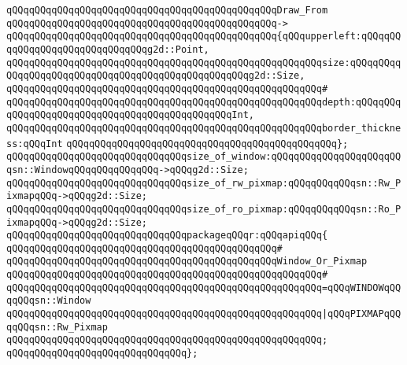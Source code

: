 \verb|qQQqqQQqqQQqqQQqqQQqqQQqqQQqqQQqqQQqqQQqqQQqqQQqDraw_From|\newline
\verb|qQQqqQQqqQQqqQQqqQQqqQQqqQQqqQQqqQQqqQQqqQQqqQQq->|\newline
\verb|qQQqqQQqqQQqqQQqqQQqqQQqqQQqqQQqqQQqqQQqqQQqqQQq{qQQqupperleft:qQQqqQQqqQQqqQQqqQQqqQQqqQQqqQQqg2d::Point,|\newline
\verb|qQQqqQQqqQQqqQQqqQQqqQQqqQQqqQQqqQQqqQQqqQQqqQQqqQQqqQQqsize:qQQqqQQqqQQqqQQqqQQqqQQqqQQqqQQqqQQqqQQqqQQqqQQqqQQqg2d::Size,|\newline
\verb|qQQqqQQqqQQqqQQqqQQqqQQqqQQqqQQqqQQqqQQqqQQqqQQqqQQqqQQq#|\newline
\verb|qQQqqQQqqQQqqQQqqQQqqQQqqQQqqQQqqQQqqQQqqQQqqQQqqQQqqQQqdepth:qQQqqQQqqQQqqQQqqQQqqQQqqQQqqQQqqQQqqQQqqQQqqQQqInt,|\newline
\verb|qQQqqQQqqQQqqQQqqQQqqQQqqQQqqQQqqQQqqQQqqQQqqQQqqQQqqQQqborder_thickness:qQQqInt|\newline
\verb|qQQqqQQqqQQqqQQqqQQqqQQqqQQqqQQqqQQqqQQqqQQqqQQq};|\newline
\newline
\verb|qQQqqQQqqQQqqQQqqQQqqQQqqQQqqQQqsize_of_window:qQQqqQQqqQQqqQQqqQQqqQQqsn::WindowqQQqqQQqqQQqqQQq->qQQqg2d::Size;|\newline
\verb|qQQqqQQqqQQqqQQqqQQqqQQqqQQqqQQqsize_of_rw_pixmap:qQQqqQQqqQQqsn::Rw_PixmapqQQq->qQQqg2d::Size;|\newline
\verb|qQQqqQQqqQQqqQQqqQQqqQQqqQQqqQQqsize_of_ro_pixmap:qQQqqQQqqQQqsn::Ro_PixmapqQQq->qQQqg2d::Size;|\newline
\newline
\verb|qQQqqQQqqQQqqQQqqQQqqQQqqQQqqQQqpackageqQQqr:qQQqapiqQQq{|\newline
\verb|qQQqqQQqqQQqqQQqqQQqqQQqqQQqqQQqqQQqqQQqqQQqqQQq#|\newline
\verb|qQQqqQQqqQQqqQQqqQQqqQQqqQQqqQQqqQQqqQQqqQQqqQQqWindow_Or_Pixmap|\newline
\verb|qQQqqQQqqQQqqQQqqQQqqQQqqQQqqQQqqQQqqQQqqQQqqQQqqQQqqQQq#|\newline
\verb|qQQqqQQqqQQqqQQqqQQqqQQqqQQqqQQqqQQqqQQqqQQqqQQqqQQqqQQq=qQQqWINDOWqQQqqQQqsn::Window|\newline
\verb|qQQqqQQqqQQqqQQqqQQqqQQqqQQqqQQqqQQqqQQqqQQqqQQqqQQqqQQq|\verb#|qQQqPIXMAPqQQqqQQqsn::Rw_Pixmap#\newline
\verb|qQQqqQQqqQQqqQQqqQQqqQQqqQQqqQQqqQQqqQQqqQQqqQQqqQQqqQQq;|\newline
\verb|qQQqqQQqqQQqqQQqqQQqqQQqqQQqqQQq};|\newline
